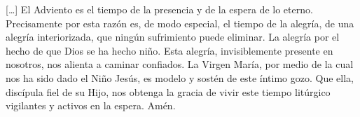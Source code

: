 \begin{introstyle}
	{[}\ldots{}{]} El Adviento es el tiempo de la presencia y de la espera de lo eterno. Precisamente por esta razón es, de modo especial, el tiempo de la alegría, de una alegría interiorizada, que ningún sufrimiento puede eliminar. La alegría por el hecho de que Dios se ha hecho niño. Esta alegría, invisiblemente presente en nosotros, nos alienta a caminar confiados. La Virgen María, por medio de la cual nos ha sido dado el Niño Jesús, es modelo y sostén de este íntimo gozo. Que ella, discípula fiel de su Hijo, nos obtenga la gracia de vivir este tiempo litúrgico vigilantes y activos en la espera. Amén.\label{fn9}
\end{introstyle}